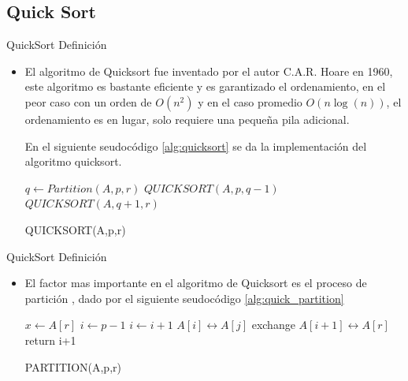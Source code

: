 \documentclass[11pt]{beamer}
\begin{document}
		\subsection{Quick Sort}
		    \begin{frame}{QuickSort Definición}
		        \begin{itemize}
		            \item El algoritmo de Quicksort fue inventado por el autor C.A.R. Hoare en 1960, este algoritmo es bastante eficiente y es garantizado el ordenamiento, en el peor caso con un orden de $O(n^2)$ y en el caso promedio $O(n\log(n))$, el ordenamiento es en lugar, solo requiere una pequeña pila adicional.
		            
		            En el siguiente seudoc\'{o}digo \ref{alg:quicksort} se da la implementaci\'{o}n del algoritmo quicksort.
    		        
    		        \begin{algorithm}[H]
                        \begin{algorithmic}[1]
                                \STATE $q \leftarrow Partition(A,p,r)$
                                \STATE $QUICKSORT(A,p,q-1)$
                                \STATE $QUICKSORT(A,q+1,r)$
                            \ENDIF
                        \end{algorithmic}
                        \caption{QUICKSORT(A,p,r)}
                        \label{alg:quicksort}
                    \end{algorithm}
                    
                    
		        \end{itemize}
		    \end{frame}
		    \begin{frame}{QuickSort Definición}
		        \begin{itemize}
		            \item El factor mas importante en el algoritmo de Quicksort es el proceso de partici\'{o}n , dado por el siguiente seudoc\'{o}digo \ref{alg:quick_partition}
		            
		            \begin{algorithm}[H]
                        \begin{algorithmic}[1]
                            \STATE $x \leftarrow A[r]$
                            \STATE $i \leftarrow p-1$
                                    \STATE $i \leftarrow i+1$
                                    \STATE $A[i] \leftrightarrow A[j]$
                                \ENDIF
                            \ENDFOR
                            \STATE exchange $A[i+1] \leftrightarrow A[r]$
                            \STATE return i+1
                        \end{algorithmic}
                        \caption{PARTITION(A,p,r)}
                        \label{alg:quick_partition}
                    \end{algorithm}
		        \end{itemize}
		    \end{frame}
		    
\end{document}
